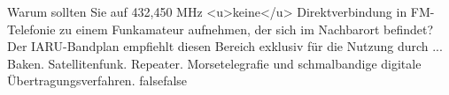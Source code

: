     {Warum sollten Sie auf 432,450 MHz <u>keine</u> Direktverbindung in FM-Telefonie zu einem Funkamateur aufnehmen, der sich im Nachbarort befindet? Der IARU-Bandplan empfiehlt diesen Bereich exklusiv für die Nutzung durch ...}
    {Baken.}
    {Satellitenfunk.}
    {Repeater.}
    {Morsetelegrafie und schmalbandige digitale Übertragungsverfahren.}
    {false}{false}